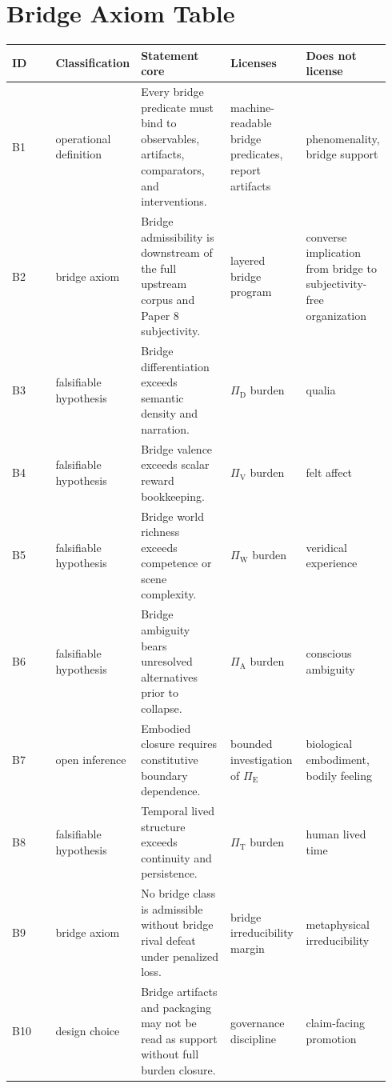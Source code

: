 \documentclass[11pt,a4paper]{article}
\theoremstyle{definition}
\newcommand{\PiD}{\Pi_{\mathrm{D}}}
\newcommand{\PiV}{\Pi_{\mathrm{V}}}
\newcommand{\PiW}{\Pi_{\mathrm{W}}}
\newcommand{\PiA}{\Pi_{\mathrm{A}}}
\newcommand{\PiE}{\Pi_{\mathrm{E}}}
\newcommand{\PiT}{\Pi_{\mathrm{T}}}
\begin{document}
\section{Bridge Axiom Table}
\begin{center}
\small
\begin{tabularx}{\linewidth}{@{}p{0.12\linewidth}p{0.2\linewidth}p{0.24\linewidth}p{0.2\linewidth}p{0.18\linewidth}@{}}
\toprule
ID & Classification & Statement core & Licenses & Does not license \\
\midrule
B1 & operational definition & Every bridge predicate must bind to observables, artifacts, comparators, and interventions. & machine-readable bridge predicates, report artifacts & phenomenality, bridge support \\
B2 & bridge axiom & Bridge admissibility is downstream of the full upstream corpus and Paper 8 subjectivity. & layered bridge program & converse implication from bridge to subjectivity-free organization \\
B3 & falsifiable hypothesis & Bridge differentiation exceeds semantic density and narration. & $\PiD$ burden & qualia \\
B4 & falsifiable hypothesis & Bridge valence exceeds scalar reward bookkeeping. & $\PiV$ burden & felt affect \\
B5 & falsifiable hypothesis & Bridge world richness exceeds competence or scene complexity. & $\PiW$ burden & veridical experience \\
B6 & falsifiable hypothesis & Bridge ambiguity bears unresolved alternatives prior to collapse. & $\PiA$ burden & conscious ambiguity \\
B7 & open inference & Embodied closure requires constitutive boundary dependence. & bounded investigation of $\PiE$ & biological embodiment, bodily feeling \\
B8 & falsifiable hypothesis & Temporal lived structure exceeds continuity and persistence. & $\PiT$ burden & human lived time \\
B9 & bridge axiom & No bridge class is admissible without bridge rival defeat under penalized loss. & bridge irreducibility margin & metaphysical irreducibility \\
B10 & design choice & Bridge artifacts and packaging may not be read as support without full burden closure. & governance discipline & claim-facing promotion \\
\bottomrule
\end{tabularx}
\end{center}
\end{document}
